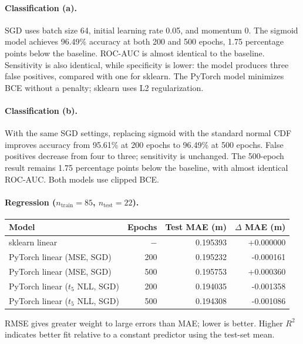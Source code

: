 \paragraph{Classification (a).} SGD uses batch size 64, initial learning rate 0.05, and momentum 0. The sigmoid model achieves 96.49\% accuracy at both 200 and 500 epochs, 1.75 percentage points below the baseline. ROC-AUC is almost identical to the baseline. Sensitivity is also identical, while specificity is lower: the model produces three false positives, compared with one for sklearn. The PyTorch model minimizes BCE without a penalty; sklearn uses L2 regularization.

\paragraph{Classification (b).} With the same SGD settings, replacing sigmoid with the standard normal CDF improves accuracy from 95.61\% at 200 epochs to 96.49\% at 500 epochs. False positives decrease from four to three; sensitivity is unchanged. The 500-epoch result remains 1.75 percentage points below the baseline, with almost identical ROC-AUC. Both models use clipped BCE.

\clearpage
\paragraph{Regression ($n_{\mathrm{train}}=85$, $n_{\mathrm{test}}=22$).}
\begin{center}
  \begin{tabular}{lrrr}
    \hline
    Model & Epochs & Test MAE (m) & $\Delta$ MAE (m) \\
    \hline
    sklearn linear & $-$ & 0.195393 & +0.000000 \\
    PyTorch linear (MSE, SGD) & 200 & 0.195232 & -0.000161 \\
    PyTorch linear (MSE, SGD) & 500 & 0.195753 & +0.000360 \\
    PyTorch linear ($t_5$ NLL, SGD) & 200 & 0.194035 & -0.001358 \\
    PyTorch linear ($t_5$ NLL, SGD) & 500 & 0.194308 & -0.001086 \\
    \hline
  \end{tabular}
\end{center}

RMSE gives greater weight to large errors than MAE; lower is better. Higher $R^2$ indicates better fit relative to a constant predictor using the test-set mean.

